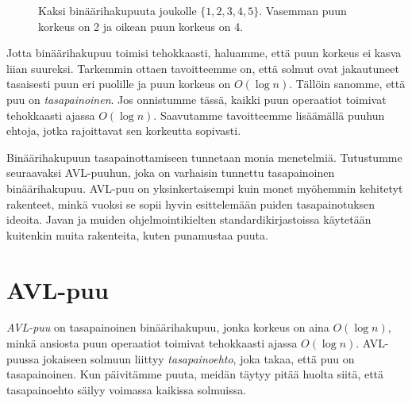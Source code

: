 \begin{figure}
\center
{}
\caption{Kaksi binäärihakupuuta joukolle $\{1,2,3,4,5\}$.
Vasemman puun korkeus on 2 ja oikean puun korkeus on 4.}
\label{fig:bihkor}
\end{figure}

Jotta binäärihakupuu toimisi tehokkaasti, haluamme,
että puun korkeus ei kasva liian suureksi.
Tarkemmin ottaen tavoitteemme on, että
solmut ovat jakautuneet tasaisesti puun eri puolille
ja puun korkeus on $O(\log n)$.
Tällöin sanomme, että puu on \emph{tasapainoinen}.
Jos onnistumme tässä, kaikki puun operaatiot toimivat
tehokkaasti ajassa $O(\log n)$.
Saavutamme tavoitteemme
lisäämällä puuhun ehtoja, jotka rajoittavat
sen korkeutta sopivasti.

Binäärihakupuun tasapainottamiseen tunnetaan monia menetelmiä.
Tutustumme seuraavaksi AVL-puuhun, joka on 
varhaisin tunnettu tasapainoinen binäärihakupuu.
AVL-puu on yksinkertaisempi kuin monet myöhemmin
kehitetyt rakenteet, minkä vuoksi se sopii hyvin esittelemään
puiden tasapainotuksen ideoita.
Javan ja muiden ohjelmointikielten standardikirjastoissa
käyte\-tään kuitenkin muita rakenteita, kuten punamustaa puuta.

\section{AVL-puu}

\emph{AVL-puu} on tasapainoinen binäärihakupuu, jonka
korkeus on aina $O(\log n)$, minkä ansiosta puun operaatiot
toimivat tehokkaasti ajassa $O(\log n)$.
AVL-puussa jokaiseen solmuun liittyy \emph{tasapainoehto},
joka takaa, että puu on tasapainoinen.
Kun päivitämme puuta, meidän täytyy pitää huolta siitä,
että tasapainoehto säilyy voimassa kaikissa solmuissa.

